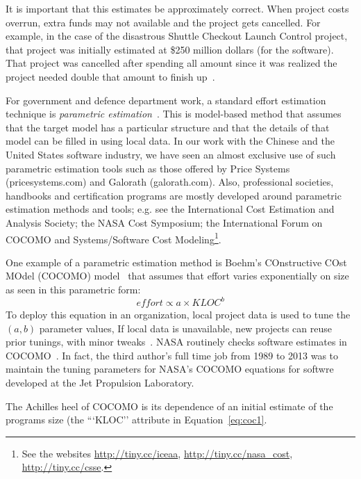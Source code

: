 \documentclass[final,twocolumn,5p]{elsarticle}
\newcommand{\eq}[1]{Equation~\ref{eq:#1}}
\begin{document}
It is important that this estimates  be approximately
correct. When project costs overrun,  extra funds may not
available and the project gets cancelled.   For example, in the case of the disastrous Shuttle Checkout Launch Control
project, that project was initially estimated at  \$250 million dollars (for the software). That project was  cancelled
after spending all  amount since it was realized the
project needed double that amount to finish up~\cite{CLCS03}.

For government and defence department
work, a  standard effort estimation technique is {\em parametric estimation}~\cite{wol74,frei79,black77,herd77,watson77,boehm81}.
This is  
 model-based method that assumes that the target model has a particular structure and that
 the details of that model can be filled in
 using local data.  
In our work with the Chinese and the United States software industry,
we have seen  an   almost exclusive
use  of such  parametric estimation tools such as those offered by 
Price Systems (pricesystems.com) and  Galorath (galorath.com).
Also,
professional societies, handbooks and
certification programs are mostly developed around 
parametric estimation methods and tools; e.g. see the 
International Cost Estimation and Analysis Society; the
NASA Cost Symposium;  the
International Forum on COCOMO and Systems/Software
Cost Modeling\footnote{See the websites \url{http://tiny.cc/iceaa}, \url{http://tiny.cc/nasa_cost}, \url{http://tiny.cc/csse}.}.

One example of a parametric estimation method is  Boehm's
COnstructive COst MOdel (COCOMO)
model~\cite{boehm81} that
 assumes  that effort varies exponentially on size as seen in this parametric form:
\begin{equation}\label{eq:coc1}
\mathit{effort} \propto \mathit{a \times KLOC}^b
\end{equation}
To deploy this equation in an organization,
local project data is used to tune the  $(a,b)$ parameter values, If local
data is unavailable, new projects can reuse prior tunings,  with  minor
tweaks~\cite{me04h}. 
NASA routinely checks  software estimates 
in  COCOMO~\cite{dabney07}.  In fact, the third author's full time job from 1989 to 2013 was to maintain
the tuning parameters for NASA's COCOMO equations for softwre developed at the Jet Propulsion Laboratory.

The Achilles heel of COCOMO is its dependence of an initial estimate of the programs size (the ```KLOC''
attribute in \eq{coc1}.
\end{document}
